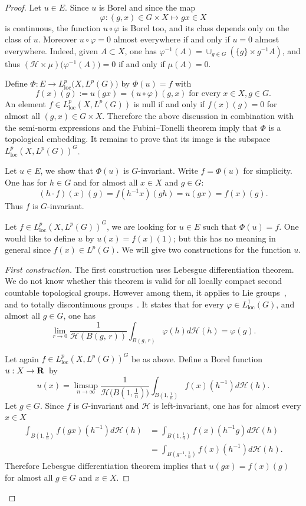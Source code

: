 \documentclass[11pt]{article}
\theoremstyle{definition}
\numberwithin{equation}{section}
\numberwithin{figure}{section}
\numberwithin{table}{section}
\DeclareMathOperator{\loc}{loc}
\newenvironment{step}[1]{\begin{proof}[#1]}{\let\qed\relax\end{proof}}
\begin{document}
\begin{proof}
Let $u \in E$. Since $u$ is Borel and since the map
\[
\varphi: (g,x) \in G \times X \mapsto gx \in X
\]
is continuous, the function $u \circ \varphi$ is Borel too, and its class depends only on the class of $u$. Moreover $u \circ \varphi = 0$ almost everywhere if and only if $u =0$ almost everywhere. Indeed, given $A \subset X$, one has $\varphi ^{-1} (A) = \cup _{g \in G} (\{g\} \times g^{-1}A)$, and thus $(\mathcal H \times \mu) \bigl(\varphi ^{-1} (A)\bigr) =0$ if and only if $\mu (A) =0$.

Define $\Phi: E \to L_{\loc} ^p \bigl(X, L^p(G)\bigr)$ by $\Phi (u) = f$ with
\[
f(x)(g):= u(gx) = (u \circ \varphi) (g,x)\;\text{for every}\;x \in X, g \in G.
\]
An element $f \in L_{\loc} ^p (X, L^p(G))$ is null if and only if $f(x)(g) =0$ for almost all $(g,x) \in G \times X$. Therefore the above discussion in combination with the semi-norm expressions and the Fubini--Tonelli theorem imply that $\Phi$ is a topological embedding. It remains to prove that its image is the subspace $L_{\loc} ^p (X, L^p(G))^G$.

Let $u \in E$, we show that $\Phi (u)$ is $G$-invariant. Write $f = \Phi (u)$ for simplicity. One has for $h \in G$ and for almost all $x \in X$ and $g \in G$:
\[
(h \cdot f)(x)(g)= f(h^{-1}x)(gh)= u(gx) = f(x)(g).
\]
Thus $f$ is $G$-invariant.

Let $f \in L_{\loc}^p (X, L^p(G))^G$, we are looking for $u \in E$ such that $\Phi (u) =f$. One would like to define $u$ by $u(x) = f(x)(1)$; but this has no meaning in general since $f(x) \in L^p(G)$. We will give two constructions for the function $u$.

\begin{step}{First construction}
The first construction uses Lebesgue differentiation theorem. We do not know whether this theorem is valid for all locally compact second countable topological groups. However among them, it applies to Lie groups~\cite[Theorem~1.8]{Hei}, and to totally discontinuous groups~\cite[Theorems~2.8.19 and 2.9.8]{Fed}. It states that for every $\varphi
\in L_{\loc}^1 (G)$, and almost all $g \in G$, one has
\[
\lim _{r \to 0} \frac{1}{\mathcal H \left(B(g,\,r)\right)} \int_{B(g,\,r)} \varphi(h) d\mathcal H(h) = \varphi (g).
\]

Let again $f \in L_{\loc}^p (X, L^p(G))^G$ be as above. Define a Borel function $u: X \to {\bf R}$~by
\[
u(x) = \limsup _{n \to \infty} \frac{1}{\mathcal H \bigl(B\left(1, \frac{1}{n}\right)\bigr) } \int _{B\left(1, \frac{1}{n}\right)} f(x)(h^{-1}) d\mathcal H(h).
\]
Let $g \in G$. Since $f$ is $G$-invariant and $\mathcal H$ is left-invariant, one has for almost every $x \in X$
\begin{align*}
\int _{B\left(1, \frac{1}{n}\right)} f(gx)(h^{-1}) d\mathcal H(h) &= \int _{B\left(1, \frac{1}{n}\right)} f(x)(h^{-1}g) d\mathcal H(h) \\
&= \int _{B\left(g^{-1}, \frac{1}{n}\right)} f(x)(h^{-1}) d\mathcal H(h).
\end{align*}
Therefore Lebesgue differentiation theorem implies that $u(gx) = f(x)(g)$ for almost all $g \in G$ and $x \in X$.
\end{step}


\end{proof}
\end{document}
